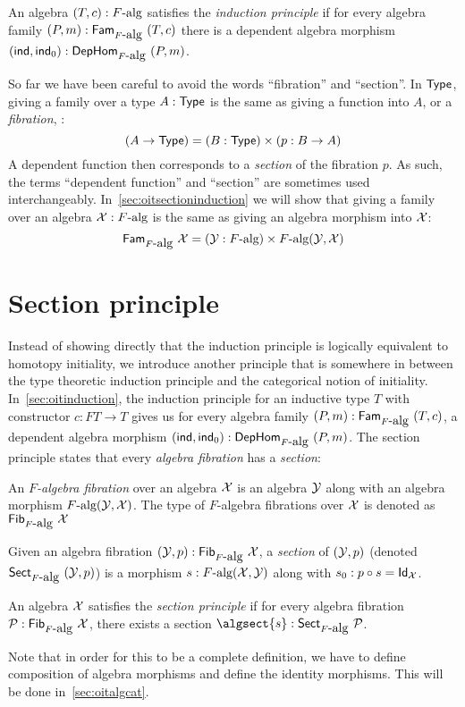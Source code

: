 \documentclass[a4paper,10pt]{report}
\begin{document}
\begin{defn}
  An algebra $(T,c) : F\mbox{-alg}$ satisfies the \emph{induction
    principle} if for every algebra family
  $(P,m) : \mathsf{Fam}_{F\mbox{-alg}}\ (T,c)$ there is a dependent algebra
  morphism $(\mathsf{ind},\mathsf{ind}_0) : \mathsf{DepHom}_{F\mbox{-alg}}\ (P,m)$.
\end{defn}

So far we have been careful to avoid the words ``fibration'' and
``section''. In $\mathsf{Type}$, giving a family over a type $A : \mathsf{Type}$ is
the same as giving a function into $A$, or a \emph{fibration}, \ie:
$$
(A \to \mathsf{Type}) = (B : \mathsf{Type}) \times (p : B \to A)
$$
A dependent function then corresponds to a \emph{section} of the
fibration $p$. As such, the terms ``dependent function'' and
``section'' are sometimes used
interchangeably. In~\cref{sec:oitsectioninduction} we will show that
giving a family over an algebra $\mathcal{X} : F\mbox{-alg}$ is the same as
giving an algebra morphism into $\mathcal{X}$:
$$
\mathsf{Fam}_{F\mbox{-alg}}\ \mathcal{X} = (\mathcal{Y} : F\mbox{-alg}) \times F\mbox{-alg}(\mathcal{Y},\mathcal{X})
$$

\section{Section principle}
\label{sec:oitsection}

Instead of showing directly that the induction principle is logically
equivalent to homotopy initiality, we introduce another principle that
is somewhere in between the type theoretic induction principle and the
categorical notion of initiality. In~\cref{sec:oitinduction}, the
induction principle for an inductive type $T$ with constructor
$c : FT \to T$ gives us for every algebra family
$(P,m) : \mathsf{Fam}_{F\mbox{-alg}}\ (T,c)$, a dependent algebra morphism
$(\mathsf{ind},\mathsf{ind}_0) : \mathsf{DepHom}_{F\mbox{-alg}}\ (P,m)$. The section principle
states that every \emph{algebra fibration} has a \emph{section}:
%
\begin{defn}
  An \emph{$F$-algebra fibration} over an algebra $\mathcal{X}$ is an
  algebra $\mathcal{Y}$ along with an algebra morphism
  $F\mbox{-alg}(\mathcal{Y},\mathcal{X})$. The type of $F$-algebra fibrations
  over $\mathcal{X}$ is denoted as $\mathsf{Fib}_{F\mbox{-alg}}\ \mathcal{X}$
\end{defn}
%
\begin{defn}
  Given an algebra fibration
  $(\mathcal{Y},p) : \mathsf{Fib}_{F\mbox{-alg}}\ \mathcal{X}$, a \emph{section} of
  $(\mathcal{Y},p)$ (denoted $\mathsf{Sect}_{F\mbox{-alg}}\ (\mathcal{Y},p)$) is a
  morphism $s : F\mbox{-alg}(\mathcal{X},\mathcal{Y})$ along with
  $s_0 : p \circ s = \mathsf{Id}_{\mathcal{X}}$.
\end{defn}
%
\begin{defn}
  An algebra $\mathcal{X}$ satisfies the \emph{section principle} if for
  every algebra fibration
  $\mathcal{P} : \mathsf{Fib}_{F\mbox{-alg}}\ \mathcal{X}$, there exists a section
  $\algsect{s} : \sectionof{\algcat{F}}{\algfib{P}}$.
\end{defn}
%
Note that in order for this to be a complete definition, we have to
define composition of algebra morphisms and define the identity
morphisms. This will be done in~\cref{sec:oitalgcat}.
\end{document}
